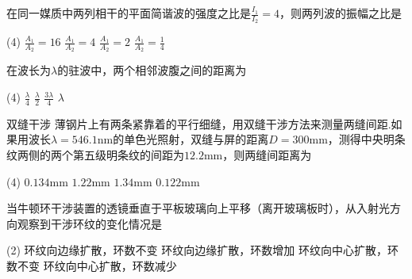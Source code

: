 {\begin{choice}[C]{}
    在同一媒质中两列相干的平面简谐波的强度之比是$\frac{I_1}{I_2}=4$，则两列波的振幅之比是
    \begin{tasks}(4)
        \task $\frac{A_1}{A_2}=16$
        \task $\frac{A_1}{A_2}=4$
        \task $\frac{A_1}{A_2}=2$
        \task $\frac{A_1}{A_2}=\frac{1}{4}$
    \end{tasks}
\end{choice}

\begin{choice}[B]{}
    在波长为$\lambda$的驻波中，两个相邻波腹之间的距离为
    \begin{tasks}(4)
        \task $\frac{\lambda}{4}$
        \task $\frac{\lambda}{2}$
        \task $\frac{3\lambda}{4}$
        \task $\lambda$
    \end{tasks}
\end{choice}

\begin{choice}[A]{双缝干涉}
    薄钢片上有两条紧靠着的平行细缝，用双缝干涉方法来测量两缝间距.如果用波长$\lambda=546.1\mathrm{nm}$的单色光照射，双缝与屏的距离$D=300\mathrm{mm}$，测得中央明条纹两侧的两个第五级明条纹的间距为$12.2\mathrm{mm}$，则两缝间距离为
    \begin{tasks}(4)
        \task $0.134\mathrm{mm}$
        \task $1.22\mathrm{mm}$
        \task $1.34\mathrm{mm}$
        \task $0.122\mathrm{mm}$
    \end{tasks}
\end{choice}

\begin{choice}[C]{}
    当牛顿环干涉装置的透镜垂直于平板玻璃向上平移（离开玻璃板时），从入射光方向观察到干涉环纹的变化情况是
    \begin{tasks}(2)
        \task 环纹向边缘扩散，环数不变
        \task 环纹向边缘扩散，环数增加
        \task 环纹向中心扩散，环数不变
        \task 环纹向中心扩散，环数减少
    \end{tasks}
\end{choice}

}

